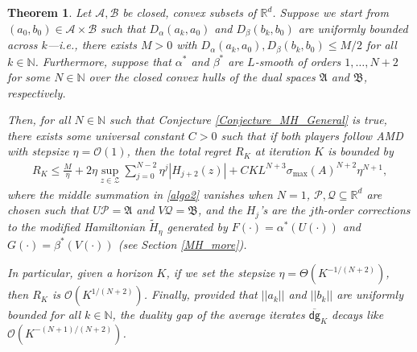 \documentclass[11pt]{article}
\newtheorem{theorem}{Theorem}
\renewcommand{\P}{\mathcal{P}}
\newcommand{\R}{\mathbb{R}}
\newcommand{\Z}{\mathcal{Z}}
\newcommand{\N}{\mathbb{N}}
\newcommand{\A}{\mathcal{A}}
\newcommand{\B}{\mathcal{B}}
\newcommand{\Q}{\mathcal{Q}}
\newcommand{\lnorm}{\left|\left|}
\newcommand{\rnorm}{\right|\right|}
\newcommand{\dg}{\textsf{dg}}
\newcommand{\frA}{\mathfrak{A}}
\newcommand{\frB}{\mathfrak{B}}
\begin{document}
\begin{theorem}\label{regretting}
    Let $\mathcal{A},\mathcal{B}$ be closed, convex subsets of $\R^{d}$. Suppose we start from $(a_{0},b_{0})\in\A\times\B$ such that $D_{\alpha}\left(a_{k},a_{0}\right)$ and $D_{\beta}\left(b_{k},b_{0}\right)$ are uniformly bounded across $k$---i.e., there exists $M>0$ with $D_{\alpha}\left(a_{k},a_{0}\right),D_{\beta}\left(b_{k},b_{0}\right)\leq M/2$ for all $k\in\N$. Furthermore, suppose that $\alpha^{*}$ and $\beta^{*}$ are $L$-smooth of orders $1,\dots,N+2$ for some $N\in\N$ over the closed convex hulls of the dual spaces $\frA$ and $\frB$, respectively.
    
    Then, for all $N\in\N$ such that Conjecture \ref{Conjecture_MH_General} is true, there exists some universal constant $C>0$ such that if both players follow AMD with stepsize $\eta=\mathcal{O}\left(1\right)$, then the total regret $R_{K}$ at iteration $K$ is bounded by
    \begin{gather}
        R_{K}\leq \frac{M}{\eta}+2\eta\sup_{z\in\Z}\sum_{j=0}^{N-2}{\eta^{j}\left|H_{j+2}(z)\right|}+CKL^{N+3}\sigma_{\max}\left(A\right)^{N+2}\eta^{N+1},\label{algo2}
    \end{gather}
    where the middle summation in \eqref{algo2} vanishes when $N=1$, $\P,\Q\subseteq\R^{d}$ are chosen such that $U\P=\mathfrak{A}$ and $V\Q=\mathfrak{B}$, and the $H_{j}$'s are the $j$th-order corrections to the modified Hamiltonian $\widetilde{H}_{\eta}$ generated by $F\left(\cdot\right)=\alpha^{*}\left(U\left(\cdot\right)\right)$ and $G\left(\cdot\right)=\beta^{*}\left(V\left(\cdot\right)\right)$ (see Section \ref{MH_more}). 
    
    In particular, given a horizon $K$, if we set the stepsize $\eta=\Theta\left(K^{-1/(N+2)}\right)$, then $R_{K}$ is $\mathcal{O}\left(K^{1/(N+2)}\right)$. Finally, provided that $\lnorm a_k\rnorm$ and $\lnorm b_k\rnorm$ are uniformly bounded for all $k\in\N$, the duality gap of the average iterates $\overline{\dg}_{K}$ decays like $\mathcal{O}\left(K^{-(N + 1)/(N + 2)}\right)$. 
\end{theorem}
\end{document}
